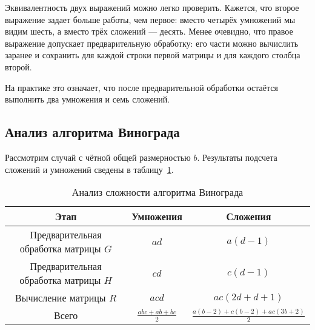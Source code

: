 Эквивалентность двух выражений можно легко проверить. Кажется, что второе выражение задает больше работы, чем первое: вместо четырёх умножений мы видим шесть, а вместо трёх сложений — десять. Менее очевидно, что правое выражение допускает предварительную обработку: его части можно вычислить заранее и сохранить для каждой строки первой матрицы и для каждого столбца второй.

На практике это означает, что после предварительной обработки остаётся выполнить два умножения и семь сложений.
\cite{algolib}

\subsection{Анализ алгоритма Винограда}

\hspace{1.25cm}
Рассмотрим случай с чётной общей размерностью $b$. Результаты подсчета сложений и умножений сведены в таблицу~\ref{table:analis_Vinigrad}.

\begin{table}[H]
\centering
\caption{Анализ сложности алгоритма Винограда}
\begin{tabular}{|c|c|c|}
\hline
Этап & Умножения & Сложения \\ \hline
Предварительная обработка матрицы $G$ & $a d$ & $a (d - 1)$ \\ \hline
Предварительная обработка матрицы $H$ & $c d$ & $c (d - 1)$ \\ \hline
Вычисление матрицы $R$ & $a c d$ & $a c (2d + d + 1)$ \\ \hline
Всего & $\frac{abc + ab + bc}{2}$ & $\frac{a(b - 2) + c(b - 2) + ac(3b + 2)}{2}$ \\ \hline
\end{tabular}
\label{table:analis_Vinigrad}
\end{table}
\cite{algolib}

\newpage